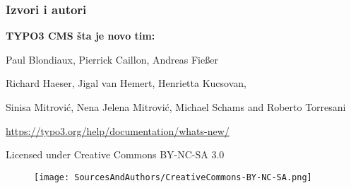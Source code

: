
\begin{frame}[fragile]
	\frametitle{Izvori i autori}

	\vspace{-0.6cm}

	\centerline{\textbf{TYPO3 CMS šta je novo tim:}}

	\begin{center}
		\centerline{Paul Blondiaux, Pierrick Caillon, Andreas Fießer}
		\centerline{Richard Haeser, Jigal van Hemert, Henrietta Kucsovan,}
		\centerline{ Sinisa Mitrović, Nena Jelena Mitrović, Michael Schams and Roberto Torresani}
	\end{center}

	\vspace{0.6cm}

	\smaller\begin{center}\url{https://typo3.org/help/documentation/whats-new/}\end{center}\normalsize

	\vspace{1cm}

	\smaller\begin{center}Licensed under Creative Commons BY-NC-SA 3.0\end{center}\normalsize
	\begin{figure}\vspace*{-0.4cm}
		\texttt{[image: SourcesAndAuthors/CreativeCommons-BY-NC-SA.png]}
	\end{figure}

\end{frame}


